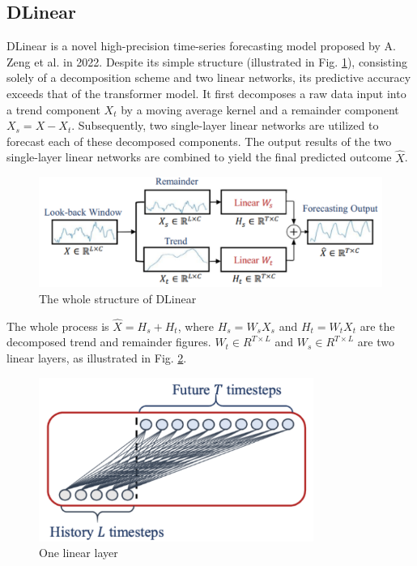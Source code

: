 \documentclass[conference]{IEEEtran}
\begin{document}
\subsection{DLinear}
DLinear is a novel high-precision time-series forecasting model proposed by A. Zeng et al. \cite{b13} in 2022. Despite its simple structure (illustrated in Fig. \ref{fig_dlinear_structure}), consisting solely of a decomposition scheme and two linear networks, its predictive accuracy exceeds that of the transformer model. It first decomposes a raw data input into a trend component \(X_t\) by a moving average kernel and a remainder component \(X_s = X - X_t\). Subsequently, two single-layer linear networks are utilized to forecast each of these decomposed components. The output results of the two single-layer linear networks are combined to yield the final predicted outcome \(\hat{X}\).
\begin{figure}[H]
    \centering
    \begin{minipage}{0.45\textwidth}
    \centering
    \includegraphics[width=1\textwidth]{figures/method/DLinear_structure.png}
    \caption{The whole structure of DLinear}
    \label{fig_dlinear_structure}
    \end{minipage}
\end{figure}\par
The whole process is \(\hat{X} = H_s + H_t\), where \(H_s = W_sX_s\) and \(H_t = W_tX_t\) are the decomposed trend and remainder figures. \(W_t \in R^{T \times L}\) and \(W_s \in R^{T \times L}\) are two linear layers, as illustrated in Fig. \ref{fig_dlinear_layer}.
\begin{figure}[H]
    \centering
    \begin{minipage}{0.45\textwidth}
    \centering
    \includegraphics[width=0.8\textwidth]{figures/method/DLinear_Layer.png}
    \caption{One linear layer}
    \label{fig_dlinear_layer}
    \end{minipage}
\end{figure}\par
\end{document}
